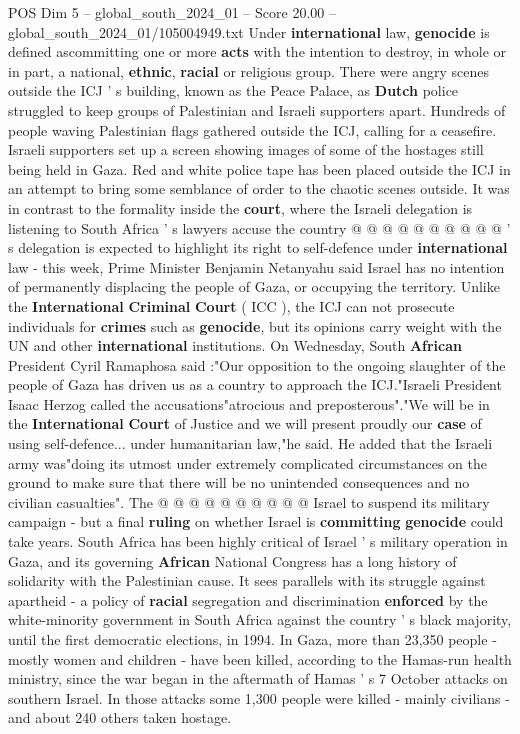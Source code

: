 \begin{textsample}{POS Dim 5 – global\_south\_2024\_01 – Score 20.00 – global\_south\_2024\_01/105004949.txt}
Under \textbf{international} law, \textbf{genocide} is defined ascommitting one or more \textbf{acts} with the intention to destroy, in whole or in part, a national, \textbf{ethnic}, \textbf{racial} or religious group.
There were angry scenes outside the ICJ ' s building, known as the Peace Palace, as \textbf{Dutch} police struggled to keep groups of Palestinian and Israeli supporters apart.
Hundreds of people waving Palestinian flags gathered outside the ICJ, calling for a ceasefire.
Israeli supporters set up a screen showing images of some of the hostages still being held in Gaza.
Red and white police tape has been placed outside the ICJ in an attempt to bring some semblance of order to the chaotic scenes outside.
It was in contrast to the formality inside the \textbf{court}, where the Israeli delegation is listening to South Africa ' s lawyers accuse the country @ @ @ @ @ @ @ @ @ @ ' s delegation is expected to highlight its right to self-defence under \textbf{international} law - this week, Prime Minister Benjamin Netanyahu said Israel has no intention of permanently displacing the people of Gaza, or occupying the territory.
Unlike the \textbf{International} \textbf{Criminal} \textbf{Court} ( ICC ), the ICJ can not prosecute individuals for \textbf{crimes} such as \textbf{genocide}, but its opinions carry weight with the UN and other \textbf{international} institutions.
On Wednesday, South \textbf{African} President Cyril Ramaphosa said :"Our opposition to the ongoing slaughter of the people of Gaza has driven us as a country to approach the ICJ."Israeli President Isaac Herzog called the accusations"atrocious and preposterous"."We will be in the \textbf{International} \textbf{Court} of Justice and we will present proudly our \textbf{case} of using self-defence... under humanitarian law,"he said.
He added that the Israeli army was"doing its utmost under extremely complicated circumstances on the ground to make sure that there will be no unintended consequences and no civilian casualties".
The @ @ @ @ @ @ @ @ @ @ Israel to suspend its military campaign - but a final \textbf{ruling} on whether Israel is \textbf{committing} \textbf{genocide} could take years.
South Africa has been highly critical of Israel ' s military operation in Gaza, and its governing \textbf{African} National Congress has a long history of solidarity with the Palestinian cause.
It sees parallels with its struggle against apartheid - a policy of \textbf{racial} segregation and discrimination \textbf{enforced} by the white-minority government in South Africa against the country ' s black majority, until the first democratic elections, in 1994.
In Gaza, more than 23,350 people - mostly women and children - have been killed, according to the Hamas-run health ministry, since the war began in the aftermath of Hamas ' s 7 October attacks on southern Israel.
In those attacks some 1,300 people were killed - mainly civilians - and about 240 others taken hostage.

\end{textsample}
